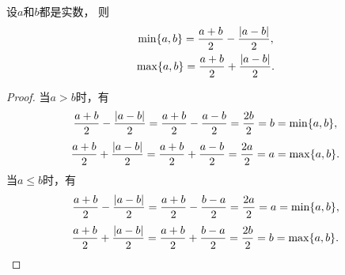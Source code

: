 \begin{proposition}
设\(a\)和\(b\)都是实数，
则\begin{gather}
	\min\{a,b\}
	= \frac{a+b}{2}
	- \frac{\abs{a-b}}{2}, \\
	\max\{a,b\}
	= \frac{a+b}{2}
	+ \frac{\abs{a-b}}{2}.
\end{gather}
\begin{proof}
当\(a>b\)时，有\begin{equation*}
	\frac{a+b}{2} - \frac{\abs{a-b}}{2}
	= \frac{a+b}{2} - \frac{a-b}{2}
	= \frac{2b}{2} = b
	= \min\{a,b\},
\end{equation*}\begin{equation*}
	\frac{a+b}{2} + \frac{\abs{a-b}}{2}
	= \frac{a+b}{2} + \frac{a-b}{2}
	= \frac{2a}{2} = a
	= \max\{a,b\}.
\end{equation*}
当\(a \leq b\)时，有\begin{equation*}
	\frac{a+b}{2} - \frac{\abs{a-b}}{2}
	= \frac{a+b}{2} - \frac{b-a}{2}
	= \frac{2a}{2} = a
	= \min\{a,b\},
\end{equation*}\begin{equation*}
	\frac{a+b}{2} + \frac{\abs{a-b}}{2}
	= \frac{a+b}{2} + \frac{b-a}{2}
	= \frac{2b}{2} = b
	= \max\{a,b\}.
	\qedhere
\end{equation*}
\end{proof}
\end{proposition}
